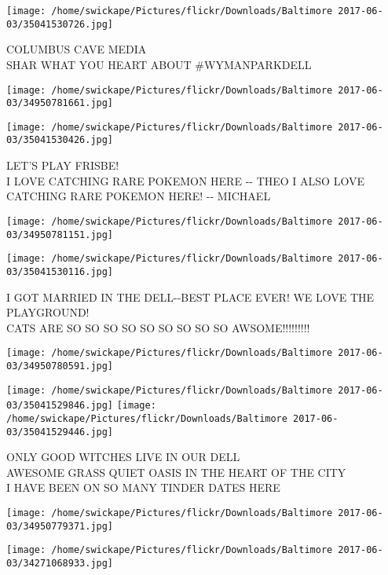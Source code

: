 \documentclass[10pt,letterpaper]{article}
\begin{document}
\vspace{0.25in}
\texttt{[image: /home/swickape/Pictures/flickr/Downloads/Baltimore 2017-06-03/35041530726.jpg]}

COLUMBUS CAVE MEDIA\\
SHAR WHAT YOU HEART ABOUT \#WYMANPARKDELL
\pagebreak

\texttt{[image: /home/swickape/Pictures/flickr/Downloads/Baltimore 2017-06-03/34950781661.jpg]}

\vspace{0.25in}
\texttt{[image: /home/swickape/Pictures/flickr/Downloads/Baltimore 2017-06-03/35041530426.jpg]}

LET'S PLAY FRISBE!\\
I LOVE CATCHING RARE POKEMON HERE {-}{-} THEO  I ALSO LOVE CATCHING RARE POKEMON HERE!  {-}{-} MICHAEL
\pagebreak

\texttt{[image: /home/swickape/Pictures/flickr/Downloads/Baltimore 2017-06-03/34950781151.jpg]}

\vspace{0.25in}
\texttt{[image: /home/swickape/Pictures/flickr/Downloads/Baltimore 2017-06-03/35041530116.jpg]}

I GOT MARRIED IN THE DELL{-}{-}BEST PLACE EVER!  WE LOVE THE PLAYGROUND!\\
CATS ARE SO SO SO SO SO SO SO SO SO AWSOME!!!!!!!!!
\pagebreak

\texttt{[image: /home/swickape/Pictures/flickr/Downloads/Baltimore 2017-06-03/34950780591.jpg]}

\vspace{0.25in}
\texttt{[image: /home/swickape/Pictures/flickr/Downloads/Baltimore 2017-06-03/35041529846.jpg]}
\texttt{[image: /home/swickape/Pictures/flickr/Downloads/Baltimore 2017-06-03/35041529446.jpg]}

ONLY GOOD WITCHES LIVE IN OUR DELL\\
AWESOME GRASS QUIET OASIS IN THE HEART OF THE CITY\\
I HAVE BEEN ON SO MANY TINDER DATES HERE
\pagebreak

\texttt{[image: /home/swickape/Pictures/flickr/Downloads/Baltimore 2017-06-03/34950779371.jpg]}

\vspace{0.25in}
\texttt{[image: /home/swickape/Pictures/flickr/Downloads/Baltimore 2017-06-03/34271068933.jpg]}
\end{document}

